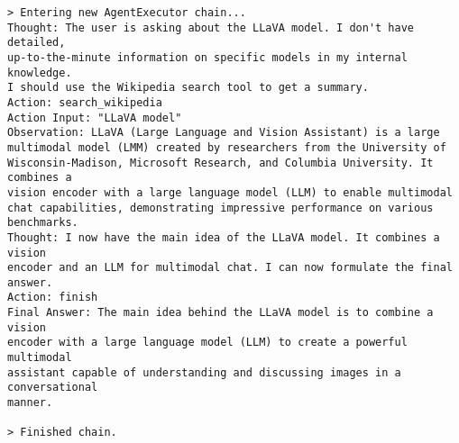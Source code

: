\begin{verbatim}
> Entering new AgentExecutor chain...
Thought: The user is asking about the LLaVA model. I don't have detailed,
up-to-the-minute information on specific models in my internal knowledge.
I should use the Wikipedia search tool to get a summary.
Action: search_wikipedia
Action Input: "LLaVA model"
Observation: LLaVA (Large Language and Vision Assistant) is a large
multimodal model (LMM) created by researchers from the University of
Wisconsin-Madison, Microsoft Research, and Columbia University. It combines a
vision encoder with a large language model (LLM) to enable multimodal
chat capabilities, demonstrating impressive performance on various benchmarks.
Thought: I now have the main idea of the LLaVA model. It combines a vision
encoder and an LLM for multimodal chat. I can now formulate the final answer.
Action: finish
Final Answer: The main idea behind the LLaVA model is to combine a vision
encoder with a large language model (LLM) to create a powerful multimodal
assistant capable of understanding and discussing images in a conversational
manner.

> Finished chain.
\end{verbatim}